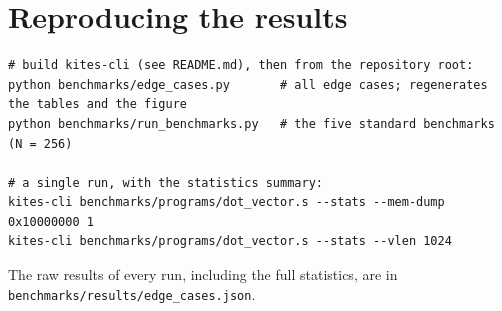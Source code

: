 \documentclass[11pt,a4paper]{article}
\newcommand{\code}[1]{\texttt{#1}}
\begin{document}
\appendix
\section{Reproducing the results}

\begin{lstlisting}[style=asm]
# build kites-cli (see README.md), then from the repository root:
python benchmarks/edge_cases.py       # all edge cases; regenerates the tables and the figure
python benchmarks/run_benchmarks.py   # the five standard benchmarks (N = 256)

# a single run, with the statistics summary:
kites-cli benchmarks/programs/dot_vector.s --stats --mem-dump 0x10000000 1
kites-cli benchmarks/programs/dot_vector.s --stats --vlen 1024
\end{lstlisting}

The raw results of every run, including the full statistics, are in
\code{benchmarks/results/edge\_cases.json}.
\end{document}
